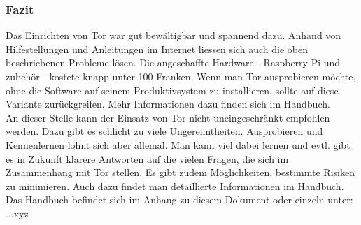 \subsubsection{Fazit}
Das Einrichten von Tor war gut bewältigbar und spannend dazu. Anhand von Hilfestellungen und Anleitungen im Internet liessen sich auch die oben beschriebenen Probleme lösen. Die angeschaffte Hardware - Raspberry Pi und zubehör - kostete knapp unter 100 Franken. Wenn man Tor ausprobieren möchte, ohne die Software auf seinem Produktivsystem zu installieren, sollte auf diese Variante zurückgreifen. Mehr Informationen dazu finden sich im Handbuch.
\\
An dieser Stelle kann der Einsatz von Tor nicht uneingeschränkt empfohlen werden. Dazu gibt es schlicht zu viele Ungereimtheiten. Ausprobieren und Kennenlernen lohnt sich aber allemal. Man kann viel dabei lernen und evtl. gibt es in Zukunft klarere Antworten auf die vielen Fragen, die sich im Zusammenhang mit Tor stellen. Es gibt zudem Möglichkeiten, bestimmte Risiken zu minimieren. Auch dazu findet man detaillierte Informationen im Handbuch.
\\
Das Handbuch befindet sich im Anhang zu diesem Dokument oder einzeln unter: ...xyz


